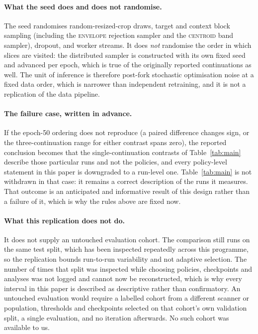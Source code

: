 \documentclass{article}
\newcommand{\ArmBest}{\textsc{centroid}}
\begin{document}
\paragraph{What the seed does and does not randomise.} The seed randomises
random-resized-crop draws, target and context block sampling (including the
\textsc{envelope} rejection sampler and the \ArmBest{} band sampler), dropout,
and worker streams. It does \emph{not} randomise the order in which slices are
visited: the distributed sampler is constructed with its own fixed seed and
advanced per epoch, which is true of the originally reported continuations as
well. The unit of inference is therefore post-fork stochastic optimisation noise
at a fixed data order, which is narrower than independent retraining, and it is
not a replication of the data pipeline.

\paragraph{The failure case, written in advance.} If the epoch-50 ordering does
not reproduce (a paired difference changes sign, or the three-continuation
range for either contrast spans zero), the reported conclusion becomes that
the single-continuation contrasts of Table~\ref{tab:main} describe those
particular runs and not the policies, and every policy-level statement in this
paper is downgraded to a run-level one. Table~\ref{tab:main} is not withdrawn in
that case: it remains a correct description of the runs it measures. That
outcome is an anticipated and informative result of this design rather than a
failure of it, which is why the rules above are fixed now.

\paragraph{What this replication does not do.} It does not supply an untouched
evaluation cohort. The comparison still runs on the same test split, which has
been inspected repeatedly across this programme, so the replication bounds
run-to-run variability and not adaptive selection. The number of times that
split was inspected while choosing policies, checkpoints and analyses was not
logged and cannot now be reconstructed, which is why every interval in this
paper is described as descriptive rather than confirmatory. An untouched
evaluation would
require a labelled cohort from a different scanner or population, thresholds and
checkpoints selected on that cohort's own validation split, a single evaluation,
and no iteration afterwards. No such cohort was available to us.
\end{document}
